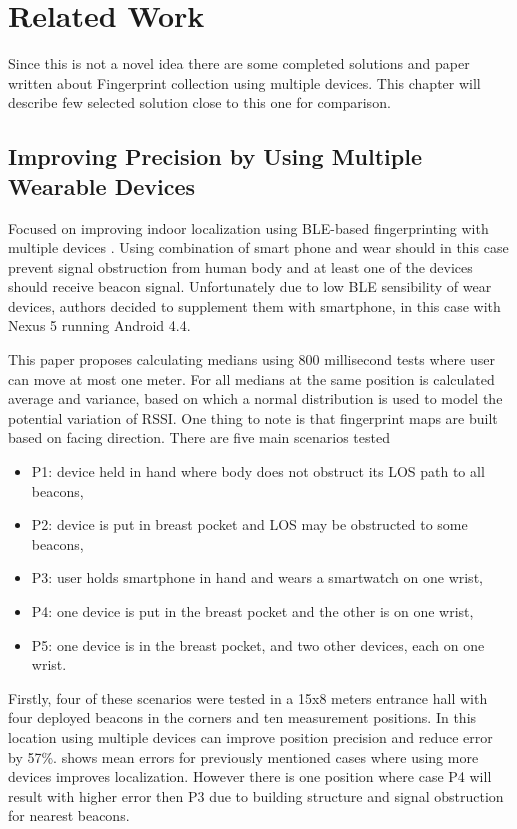 \chapter{Related Work}\label{sec:RelatedWork}
Since this is not a novel idea there are some completed solutions and paper written about Fingerprint collection using multiple devices. This chapter will describe few selected solution close to this one for comparison.

\section{Improving Precision by Using Multiple Wearable Devices}\label{sec:IPUMWD}
Focused on improving indoor localization using BLE-based fingerprinting with multiple devices \cite{IPBLEIUMWD}. Using combination of smart phone and wear should in this case prevent signal obstruction from human body and at least one of the devices should receive beacon signal. Unfortunately due to low BLE sensibility of wear devices, authors decided to supplement them with smartphone, in this case with Nexus 5 running Android 4.4.

This paper proposes calculating medians using 800 millisecond tests where user can move at most one meter. For all medians at the same position is calculated average and variance, based on which a normal distribution is used to model the potential variation of RSSI. One thing to note is that fingerprint maps are built based on facing direction. There are five main scenarios tested

\begin{itemize}
	\item P1: device held in hand where body does not obstruct its LOS path to all beacons,
	\item P2: device is put in breast pocket and LOS may be obstructed to some beacons,
	\item P3: user holds smartphone in hand and wears a smartwatch on one wrist,
	\item P4: one device is put in the breast pocket and the other is on one wrist,
	\item P5: one device is in the breast pocket, and two other devices, each on one wrist.
\end{itemize} 

Firstly, four of these scenarios were tested in a 15x8 meters entrance hall with four deployed beacons in the corners and ten measurement positions. In this location using multiple devices can improve position precision and reduce error by 57\%.  shows mean errors for previously mentioned cases where using more devices improves localization. However there is one position where case P4 will result with higher error then P3 due to building structure and signal obstruction for nearest beacons.

